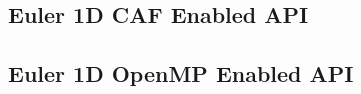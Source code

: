 \subsection{Euler 1D CAF Enabled API}\label{subsec:euler-1D-CAF-API}

\subsection{Euler 1D OpenMP Enabled API}\label{subsec:euler-1D-OpenMP-API}
